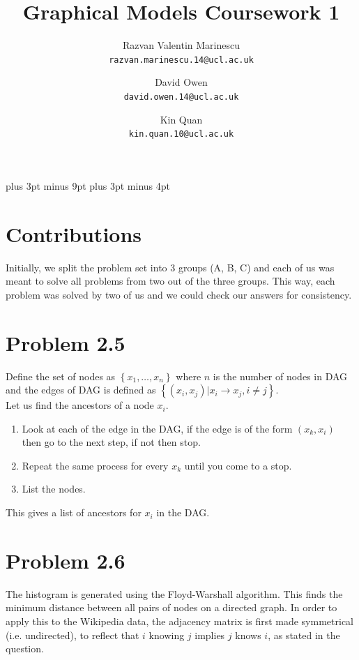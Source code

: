\documentclass[11pt,a4paper,oneside]{report}
\title{Graphical Models Coursework 1}
\author{
    Razvan Valentin Marinescu\\
    \texttt{razvan.marinescu.14@ucl.ac.uk}
    \and
    David Owen\\
    \texttt{david.owen.14@ucl.ac.uk}
    \and
    Kin Quan\\
    \texttt{kin.quan.10@ucl.ac.uk}
}
\begin{document}
\belowdisplayskip=12pt plus 3pt minus 9pt
\belowdisplayshortskip=7pt plus 3pt minus 4pt

\maketitle{}

\section*{Contributions}

Initially, we split the problem set into 3 groups (A, B, C) and each of us was 
meant to solve all problems from two out of the three groups. This way, each 
problem was solved by two of us and we could check our answers for 
consistency. 

\begin{table}
 
\end{table}


\section*{Problem 2.5}
Define the set of nodes as $\left\{x_{1}, \ldots , x_{n} \right\}$ where $n$ is the number of nodes in DAG and the edges of DAG is defined as $\left\{ (x_{i},x_{j}) | x_{i} \rightarrow x_{j}, i \neq j \right\}$. \\
\newline
Let us find the ancestors of a node $x_{i}$.
\begin{enumerate}
	\item Look at each of the edge in the DAG, if the edge is of the form $(x_{k},x_{i})$ then go to the next step, if not then stop.
	\item Repeat the same process for every $x_{k}$ until you come to a stop.
	\item List the nodes.
\end{enumerate}
This gives a list of ancestors for $x_{i}$ in the DAG.

\section*{Problem 2.6}

The histogram is generated using the Floyd-Warshall algorithm. This finds the minimum distance between all pairs of nodes on a directed graph. In order to apply this to the Wikipedia data, the adjacency matrix is first made symmetrical (i.e. undirected), to reflect that $i$ knowing $j$ implies $j$ knows $i$, as stated in the question.
\end{document}
